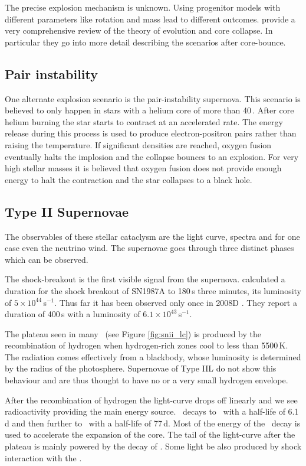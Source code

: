 The precise explosion mechanism is unknown. Using progenitor models with different parameters like rotation and mass lead to different outcomes. \citet{2002RvMP...74.1015W} provide a very comprehensive review of the theory of evolution and core collapse. In particular they go into more detail describing the scenarios after core-bounce.

\subsection{Pair instability}
One alternate explosion scenario is the pair-instability supernova. This scenario is believed to only happen in stars with a helium core of more than 40\,\msun. After core helium burning the star starts to contract at an accelerated rate. The energy release during this process is used to produce electron-positron pairs rather than raising the temperature. If significant densities are reached, oxygen fusion eventually halts the implosion and the collapse bounces to an explosion. For very high stellar masses it is believed that oxygen fusion does not provide enough energy to halt the contraction and the star collapses to a black hole.


\subsection{Type II Supernovae}
The observables of these stellar cataclysm are the light curve, spectra and for one case even the neutrino wind. The supernovae goes through three distinct phases which can be observed. 

The shock-breakout is the first visible signal from the supernova.  \cite{1992ApJ...393..742E} calculated a duration for the  shock breakout of SN1987A to 180\,s three minutes, its  luminosity of $5\times10^{44}$\erg\,s$^{-1}$. 
Thus far it has been observed only once in 2008D \citep{2008Natur.453..469S}. They report a duration of 400\,s with a luminosity of $6.1\times10^{43}$\erg\,s$^{-1}$.

The plateau seen in many \snii\ (see Figure \ref{fig:snii_lc}) is produced by the recombination of hydrogen when hydrogen-rich zones cool to less than 5500\,K. The radiation comes effectively from a blackbody, whose luminosity is determined  by the radius of the photosphere.
Supernovae of Type IIL do not show this behaviour and are thus thought to have no or a very small hydrogen envelope.


After the recombination of hydrogen the light-curve drops off linearly and we see radioactivity providing the main energy source. \Ni\ decays to \Co\ with a half-life of 6.1\,d and then further to \Fe\ with a half-life of 77\,d. Most of the energy of the \Ni\ decay is used to accelerate the expansion of the core. The tail of the light-curve after the plateau is mainly powered by the decay of \Co. Some light be also produced by shock interaction with the \csm.





